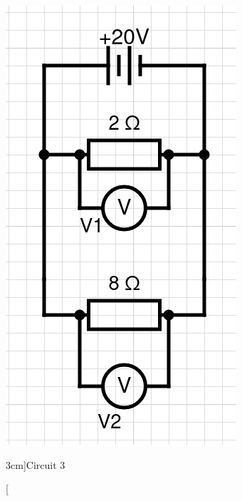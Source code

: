 \documentclass[a4paper,openany,nobib]{tufte-book}
\begin{document}
\begin{figure}[h!]
	\center
	\includegraphics[width=0.5\linewidth]{circ3}
	\caption[][3cm]{Circuit 3}
\end{figure}
\end{document}

